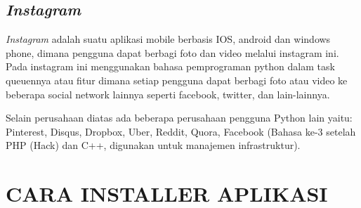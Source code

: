 \section*{\textit{Instagram}}
\textit{Instagram} adalah suatu aplikasi mobile berbasis IOS, android dan windows phone, dimana pengguna dapat berbagi foto dan video melalui instagram ini. Pada instagram ini menggunakan bahasa pemprograman python dalam task queuennya atau fitur dimana setiap pengguna dapat berbagi foto atau video ke beberapa social network lainnya seperti facebook, twitter, dan lain-lainnya.

Selain perusahaan diatas ada beberapa perusahaan pengguna Python lain yaitu: Pinterest, Disqus, Dropbox, Uber, Reddit, Quora, Facebook (Bahasa ke-3 setelah PHP (Hack) dan C++, digunakan untuk manajemen infrastruktur).
\par
\chapter*{CARA INSTALLER APLIKASI}
